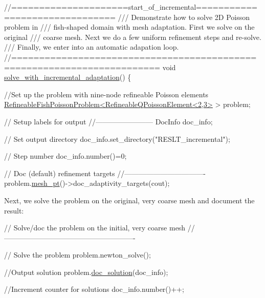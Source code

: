  
\begin{DoxyCodeInclude}
\textcolor{comment}{//=====================start\_of\_incremental===============================}
\textcolor{comment}{/// Demonstrate how to solve 2D Poisson problem in }
\textcolor{comment}{}\textcolor{comment}{/// fish-shaped domain with mesh adaptation. First we solve on the original}
\textcolor{comment}{}\textcolor{comment}{/// coarse mesh. Next we do a few uniform refinement steps and re-solve.}
\textcolor{comment}{}\textcolor{comment}{/// Finally, we enter into an automatic adapation loop.}
\textcolor{comment}{}\textcolor{comment}{//========================================================================}
\textcolor{keywordtype}{void} \hyperlink{fish__poisson_8cc_a9f5ae2c03a7f02e61857d322177ce5d5}{solve\_with\_incremental\_adaptation}()
\{
 
 \textcolor{comment}{//Set up the problem with nine-node refineable Poisson elements}
 \hyperlink{classRefineableFishPoissonProblem}{RefineableFishPoissonProblem<RefineableQPoissonElement<2,3>}
       > problem;
 
 \textcolor{comment}{// Setup labels for output}
 \textcolor{comment}{//------------------------}
 DocInfo doc\_info;
 
 \textcolor{comment}{// Set output directory}
 doc\_info.set\_directory(\textcolor{stringliteral}{"RESLT\_incremental"}); 
 
 \textcolor{comment}{// Step number}
 doc\_info.number()=0;
  
  
 \textcolor{comment}{// Doc (default) refinement targets}
 \textcolor{comment}{//----------------------------------}
 problem.\hyperlink{classRefineableFishPoissonProblem_a803c9050b07b35aba22f08a5a9e59f2c}{mesh\_pt}()->doc\_adaptivity\_targets(cout);

\end{DoxyCodeInclude}


Next, we solve the problem on the original, very coarse mesh and document the result\+:

 
\begin{DoxyCodeInclude}
 \textcolor{comment}{// Solve/doc the problem on the initial, very coarse mesh}
 \textcolor{comment}{//-------------------------------------------------------}
 
 \textcolor{comment}{// Solve the problem}
 problem.newton\_solve();
 
 \textcolor{comment}{//Output solution}
 problem.\hyperlink{classRefineableFishPoissonProblem_aeee1bf23216971b50b8822c45e62c48b}{doc\_solution}(doc\_info);
 
 \textcolor{comment}{//Increment counter for solutions }
 doc\_info.number()++;

\end{DoxyCodeInclude}


